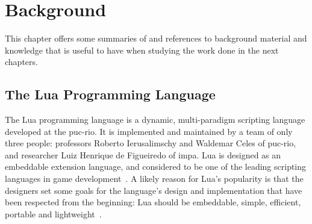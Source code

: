\chapter{Background}
\label{chp:background}
This chapter offers some summaries of and references to background material and knowledge that is useful to have when studying the work done in the next chapters. 

\section{The Lua Programming Language}
\label{sec:lua_language}

The Lua programming language is a dynamic, multi-paradigm scripting language developed at the \gls{puc-rio}. It is implemented and maintained by a team of only three people: professors Roberto Ierusalimschy and Waldemar Celes of \gls{puc-rio}, and researcher Luiz Henrique de Figueiredo of \gls{impa}. Lua is designed as an embeddable extension language, and considered to be one of the leading scripting languages in game development~\cite{inproceedings:the_evolution_of_lua}. A likely reason for Lua's popularity is that the designers set some goals for the language's design and implementation that have been respected from the beginning: Lua should be embeddable, simple, efficient, portable and lightweight~\cite{article:the_implementation_of_lua}.

